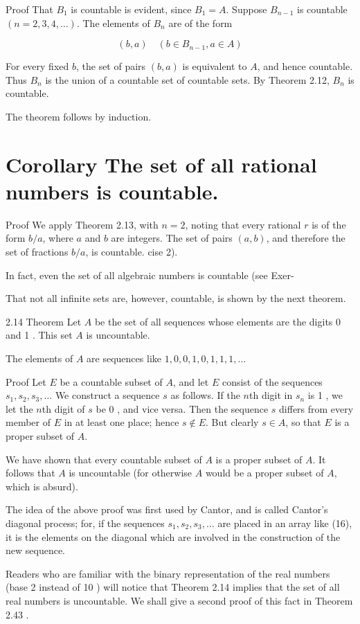 \documentclass[10pt]{article}
\begin{document}
Proof That $B_{1}$ is countable is evident, since $B_{1}=A$. Suppose $B_{n-1}$ is countable $(n=2,3,4, \ldots)$. The elements of $B_{n}$ are of the form

$$
(b, a) \quad\left(b \in B_{n-1}, a \in A\right)
$$

For every fixed $b$, the set of pairs $(b, a)$ is equivalent to $A$, and hence countable. Thus $B_{n}$ is the union of a countable set of countable sets. By Theorem 2.12, $B_{n}$ is countable.

The theorem follows by induction.

\section{Corollary The set of all rational numbers is countable.}
Proof We apply Theorem 2.13, with $n=2$, noting that every rational $r$ is of the form $b / a$, where $a$ and $b$ are integers. The set of pairs $(a, b)$, and therefore the set of fractions $b / a$, is countable. cise 2).

In fact, even the set of all algebraic numbers is countable (see Exer-

That not all infinite sets are, however, countable, is shown by the next theorem.

2.14 Theorem Let $A$ be the set of all sequences whose elements are the digits 0 and 1 . This set $A$ is uncountable.

The elements of $A$ are sequences like $1,0,0,1,0,1,1,1, \ldots$

Proof Let $E$ be a countable subset of $A$, and let $E$ consist of the sequences $s_{1}, s_{2}, s_{3}, \ldots$ We construct a sequence $s$ as follows. If the $n$th digit in $s_{n}$ is 1 , we let the $n$th digit of $s$ be 0 , and vice versa. Then the sequence $s$ differs from every member of $E$ in at least one place; hence $s \notin E$. But clearly $s \in A$, so that $E$ is a proper subset of $A$.

We have shown that every countable subset of $A$ is a proper subset of $A$. It follows that $A$ is uncountable (for otherwise $A$ would be a proper subset of $A$, which is absurd).

The idea of the above proof was first used by Cantor, and is called Cantor's diagonal process; for, if the sequences $s_{1}, s_{2}, s_{3}, \ldots$ are placed in an array like (16), it is the elements on the diagonal which are involved in the construction of the new sequence.

Readers who are familiar with the binary representation of the real numbers (base 2 instead of 10 ) will notice that Theorem 2.14 implies that the set of all real numbers is uncountable. We shall give a second proof of this fact in Theorem 2.43 .
\end{document}
